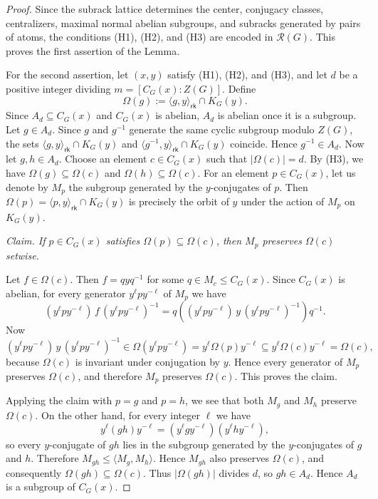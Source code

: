 \documentclass[a4paper,12pt]{article}
\theoremstyle{definition}
\theoremstyle{remark}
\begin{document}
\begin{proof}
  Since the subrack lattice determines the center, conjugacy classes, centralizers, maximal normal abelian subgroups, and subracks generated by pairs of atoms, the conditions (H1), (H2), and (H3) are encoded in $\mathcal R(G)$. This proves the first assertion of the Lemma.

  For the second assertion, let $(x,y)$ satisfy (H1), (H2), and (H3), and let $d$ be a positive integer dividing $m=[C_G(x):Z(G)]$. Define
  $$ \Omega(g):=\langle g,y\rangle_{\mathsf{rk}}\cap K_G(y). $$
  Since $A_d\subseteq C_G(x)$ and $C_G(x)$ is abelian, $A_d$ is abelian once it is a subgroup. Let $g\in A_d$. Since $g$ and $g^{-1}$ generate the same cyclic subgroup modulo $Z(G)$, the sets $\langle g,y\rangle_{\mathsf{rk}}\cap K_G(y)$ and $\langle g^{-1},y\rangle_{\mathsf{rk}}\cap K_G(y)$ coincide. Hence $g^{-1}\in A_d$. Now let $g,h\in A_d$. Choose an element $c\in C_G(x)$ such that $|\Omega(c)|=d$. By (H3), we have $\Omega(g)\subseteq \Omega(c)$ and $\Omega(h)\subseteq \Omega(c)$. For an element $p\in C_G(x)$, let us denote by $M_p$ the subgroup generated by the $y$-conjugates of $p$. Then $\Omega(p)=\langle p,y\rangle_{\mathsf{rk}}\cap K_G(y)$ is precisely the orbit of $y$ under the action of $M_p$ on $K_G(y)$.

  \medskip
  \noindent
  \emph{Claim. If $p\in C_G(x)$ satisfies $\Omega(p)\subseteq \Omega(c)$, then $M_p$ preserves $\Omega(c)$ setwise.}

  \medskip
  Let $f\in \Omega(c)$. Then $f=qyq^{-1}$ for some $q\in M_c\leq C_G(x)$. Since $C_G(x)$ is abelian, for every generator $y^\ell p y^{-\ell}$ of $M_p$ we have $$ (y^\ell p y^{-\ell})\, f\, (y^\ell p y^{-\ell})^{-1} = q((y^\ell p y^{-\ell})\, y\, (y^\ell p y^{-\ell})^{-1})q^{-1}. $$
  Now
  $$ (y^\ell p y^{-\ell})\, y\, (y^\ell p y^{-\ell})^{-1}\in \Omega(y^\ell p y^{-\ell}) = y^\ell \Omega(p) y^{-\ell}\subseteq y^\ell \Omega(c) y^{-\ell}=\Omega(c), $$
  because $\Omega(c)$ is invariant under conjugation by $y$. Hence every generator of $M_p$ preserves $\Omega(c)$, and therefore $M_p$ preserves $\Omega(c)$. This proves the claim.

  \medskip
  Applying the claim with $p=g$ and $p=h$, we see that both $M_g$ and $M_h$ preserve $\Omega(c)$. On the other hand, for every integer $\ell$ we have
  $$ y^\ell (gh) y^{-\ell}=(y^\ell g y^{-\ell})(y^\ell h y^{-\ell}), $$
  so every $y$-conjugate of $gh$ lies in the subgroup generated by the $y$-conjugates of $g$ and $h$. Therefore $M_{gh}\leq \langle M_g,M_h\rangle$. Hence $M_{gh}$ also preserves $\Omega(c)$, and consequently $\Omega(gh)\subseteq \Omega(c)$. Thus $|\Omega(gh)|$ divides $d$, so $gh\in A_d$. Hence $A_d$ is a subgroup of $C_G(x)$.


\end{proof}
\end{document}
